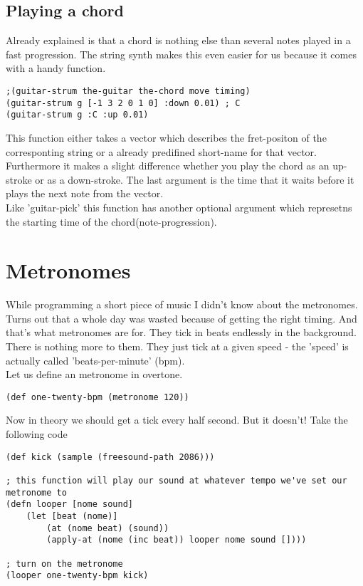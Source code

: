 \subsection{Playing a chord}
Already explained is that a chord is nothing else than several notes played in a fast progression. The string synth makes this even easier for us because it comes with a handy function.
\begin{lstlisting}
;(guitar-strum the-guitar the-chord move timing)
(guitar-strum g [-1 3 2 0 1 0] :down 0.01) ; C
(guitar-strum g :C :up 0.01)
\end{lstlisting} 
This function either takes a vector which describes the fret-positon of the corresponting string or a already predifined short-name for that vector. Furthermore it makes a slight difference whether you play the chord as an up-stroke or as a down-stroke. The last argument is the time that it waits before it plays the next note from the vector.\\ Like 'guitar-pick' this function has another optional argument which represetns the starting time of the chord(note-progression).

\section{Metronomes}
While programming a short piece of music I didn't know about the metronomes. Turns out that a whole day was wasted because of getting the right timing. And that's what metronomes are for. They tick in beats endlessly in the background. There is nothing more to them. They just tick at a given speed - the 'speed' is actually called 'beats-per-minute' (bpm).\\
Let us define an metronome in overtone.
\begin{lstlisting}
(def one-twenty-bpm (metronome 120))
\end{lstlisting}
Now in theory we should get a tick every half second. But it doesn't!
Take the following code
\begin{lstlisting}
(def kick (sample (freesound-path 2086)))

; this function will play our sound at whatever tempo we've set our metronome to 
(defn looper [nome sound]    
    (let [beat (nome)]
        (at (nome beat) (sound))
        (apply-at (nome (inc beat)) looper nome sound [])))

; turn on the metronome
(looper one-twenty-bpm kick)
\end{lstlisting}

